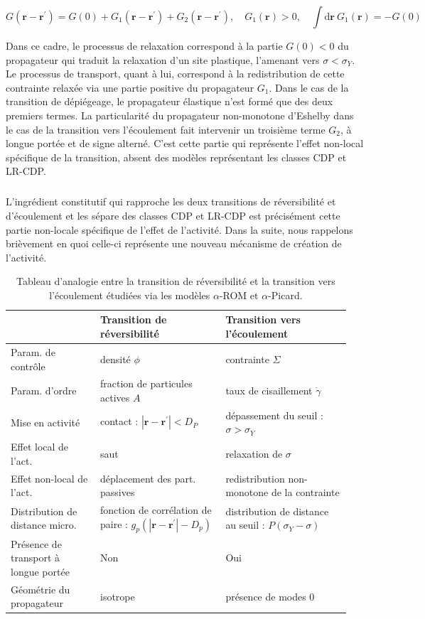 \begin{equation}
	G(\mathbf{r}-\mathbf{r}^\prime) = G(0) + G_1(\mathbf{r}-\mathbf{r}^\prime) + G_2(\mathbf{r}-\mathbf{r}^\prime), \quad G_1(\mathbf{r}) > 0, \quad \int \mathrm{d}\mathbf{r}~ G_1(\mathbf{r}) = -G(0)
\end{equation}

\noindent Dans ce cadre, le processus de relaxation correspond à la partie $G(0)<0$ du propagateur qui traduit la relaxation d'un site plastique, l'amenant vers $\sigma < \sigma_Y$. Le processus de transport, quant à lui, correspond à la redistribution de cette contrainte relaxée via une partie positive du propagateur $G_1$. Dans le cas de la transition de dépiégeage, le propagateur élastique n'est formé que des deux premiers termes. La particularité du propagateur non-monotone d'Eshelby dans le cas de la transition vers l'écoulement fait intervenir un troisième terme $G_2$, à longue portée et de signe alterné. C'est cette partie qui représente l'effet non-local spécifique de la transition, absent des modèles représentant les classes CDP et LR-CDP.

\subparagraph{}L'ingrédient constitutif qui rapproche les deux transitions de réversibilité et d'écoulement et les sépare des classes CDP et LR-CDP est précisément cette partie non-locale spécifique de l'effet de l'activité. Dans la suite, nous rappelons brièvement en quoi celle-ci représente une nouveau mécanisme de création de l'activité.

\begingroup

\setlength{\tabcolsep}{10pt}
\renewcommand{\arraystretch}{1.5}

\begin{table}[h]
\centering
\begin{tabular}{P{0.25\linewidth}P{0.35\linewidth}P{0.35\linewidth}}
\hline \hline  & Transition de réversibilité & Transition vers l'écoulement \\
\hline
Param. de contrôle  & densité $\phi$ & contrainte $\Sigma$ \\
Param. d'ordre & fraction de particules actives $A$ & taux de cisaillement $\dot{\gamma}$ \\
Mise en activité & contact : $|\mathbf{r}-\mathbf{r}^\prime| < D_P$ & dépassement du seuil : $\sigma > \sigma_Y$\\
Effet local de l'act. & saut & relaxation de $\sigma$ \\
Effet non-local de l'act. & déplacement des part. passives & redistribution non-monotone de la contrainte \\
Distribution de distance micro.  & fonction de corrélation de paire : $g_p(|\mathbf{r}-\mathbf{r}^\prime|-D_p)$ & distribution de distance au seuil : $P(\sigma_Y - \sigma)$\\
\hline 
Présence de transport à longue portée & Non & Oui \\
Géométrie du propagateur & isotrope & présence de modes 0 \\
\hline \hline
\end{tabular}
\caption{Tableau d'analogie entre la transition de réversibilité et la transition vers l'écoulement étudiées via les modèles $\alpha$-ROM et $\alpha$-Picard.}
\label{tab:analogie}
\end{table}

